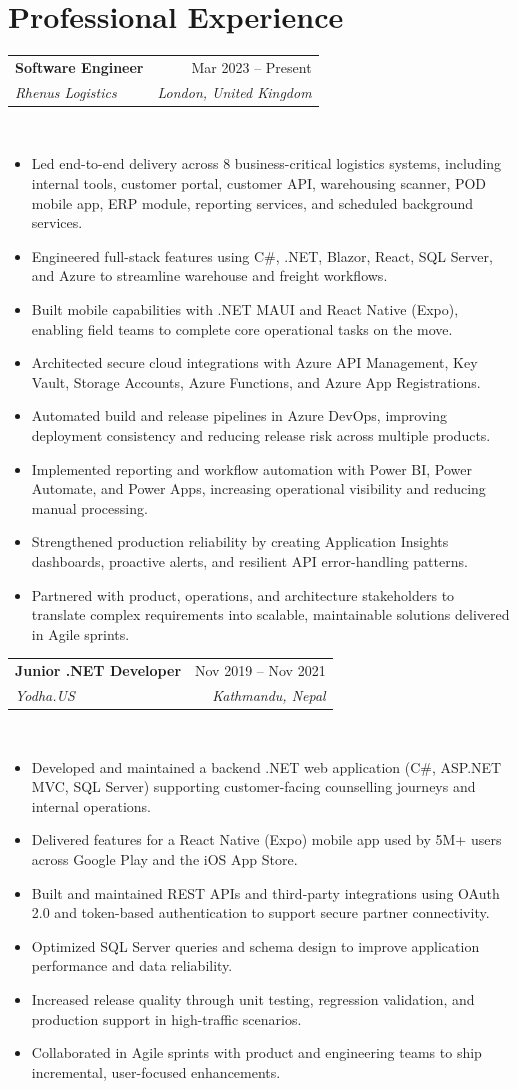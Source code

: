 \documentclass[10pt,a4paper]{article}
\makeatletter
\newcommand{\cvgroupgap}{\vspace{0.7em}}
\newcommand{\cvrole}[4]{
	\begin{tabular*}{\linewidth}{@{\extracolsep{\fill}}lr}
		\textbf{#1} & #2\\
		\textit{#3} & \textit{#4}\\
	\end{tabular*}\\[-0.35em]
}
\makeatother
\begin{document}
\section*{Professional Experience}
\cvrole{Software Engineer}{Mar 2023 -- Present}{Rhenus Logistics}{London, United Kingdom}
\begin{itemize}
	\item Led end-to-end delivery across 8 business-critical logistics systems, including internal tools, customer portal, customer API, warehousing scanner, POD mobile app, ERP module, reporting services, and scheduled background services.
	\item Engineered full-stack features using C\#, .NET, Blazor, React, SQL Server, and Azure to streamline warehouse and freight workflows.
	\item Built mobile capabilities with .NET MAUI and React Native (Expo), enabling field teams to complete core operational tasks on the move.
	\item Architected secure cloud integrations with Azure API Management, Key Vault, Storage Accounts, Azure Functions, and Azure App Registrations.
	\item Automated build and release pipelines in Azure DevOps, improving deployment consistency and reducing release risk across multiple products.
	\item Implemented reporting and workflow automation with Power BI, Power Automate, and Power Apps, increasing operational visibility and reducing manual processing.
	\item Strengthened production reliability by creating Application Insights dashboards, proactive alerts, and resilient API error-handling patterns.
	\item Partnered with product, operations, and architecture stakeholders to translate complex requirements into scalable, maintainable solutions delivered in Agile sprints.
\end{itemize}

\cvgroupgap

\cvrole{Junior .NET Developer}{Nov 2019 -- Nov 2021}{Yodha.US}{Kathmandu, Nepal}
\begin{itemize}
	\item Developed and maintained a backend .NET web application (C\#, ASP.NET MVC, SQL Server) supporting customer-facing counselling journeys and internal operations.
	\item Delivered features for a React Native (Expo) mobile app used by 5M+ users across Google Play and the iOS App Store.
	\item Built and maintained REST APIs and third-party integrations using OAuth 2.0 and token-based authentication to support secure partner connectivity.
	\item Optimized SQL Server queries and schema design to improve application performance and data reliability.
	\item Increased release quality through unit testing, regression validation, and production support in high-traffic scenarios.
	\item Collaborated in Agile sprints with product and engineering teams to ship incremental, user-focused enhancements.
\end{itemize}
\end{document}
